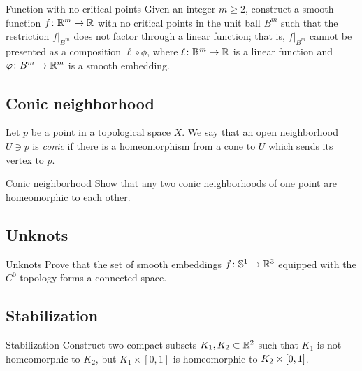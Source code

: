 \begin{pr}{}{Function with no critical points}\label{Function with no critical points}
Given an integer $m\ge 2$, 
construct a smooth function $f\colon\mathbb{R}^m\to \mathbb{R}$ 
with no critical points in the unit ball $B^m$ 
such that the restriction $f|_{B^m}$ does not factor through a linear function;
that is, 
$f|_{B^m}$ cannot be presented as a composition
$\ell\circ\phi$,
where $\ell\colon\mathbb{R}^m\to\mathbb{R}$ is a linear function 
and $\varphi\colon B^m\to\mathbb{R}^m$ is a smooth embedding.
\end{pr}

\subsection*{Conic neighborhood}
\label{Conic neighborhood}

Let $p$ be a point in a topological space $X$.
We say that an open neighborhood $U\ni p$ is \emph{conic}
if there is a homeomorphism from a cone
to $U$ which sends its vertex to $p$.

\begin{pr}{}{Conic neighborhood}  
Show that any two conic neighborhoods of one point are homeomorphic to each other.
\end{pr}

\subsection*{Unknots}

\begin{pr}{}{Unknots}\label{No knots}
Prove that the set of smooth embeddings $f\:\mathbb{S}^1\z\to\RR^3$ equipped with the $C^0$-topology 
forms a connected space.
\end{pr}

\subsection*{Stabilization}

\begin{pr}{}{Stabilization}\label{Simple stabilization}
Construct two compact subsets $K_1, K_2\subset\mathbb{R}^2$ such that
$K_1$ is not homeomorphic to $K_2$, but $K_1\times[0,1]$ is homeomorphic to $K_2\z\times[0,1]$.
\end{pr}

